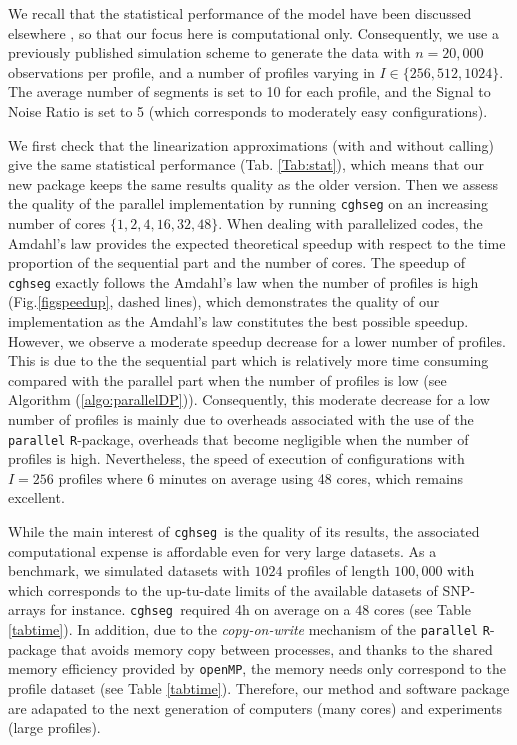 \documentclass[11pt]{llncs}
\newcommand{\esoft}{\texttt{cghseg }}
\begin{document}
{We recall that the statistical performance of the model have been discussed elsewhere \cite{PLH11}, so that our focus here is computational only. Consequently, we use a previously published simulation scheme to generate the data \cite{POA09,PLH11} with $n=20,000$ observations per profile, and a number of profiles varying in $I \in \{256,512,1024\}$. The average number of segments is set to 10 for each profile, and the Signal to Noise Ratio is set to 5 (which corresponds to  moderately easy configurations). 

We first check that the linearization approximations (with and without calling) give the same statistical performance (Tab. \ref{Tab:stat}), which means that our new package keeps the same results quality as the older version. Then we assess the quality of the parallel implementation by running \texttt{cghseg} on an increasing number of cores $\{1,2,4,16,32,48\}$. When dealing with parallelized codes, the Amdahl's law \cite{AG67} provides the expected theoretical speedup with respect to the time proportion of the sequential part and the number of cores. The speedup of \texttt{cghseg} exactly follows the Amdahl's law when the number of profiles is high (Fig.\ref{figspeedup}, dashed lines), which demonstrates the quality of our implementation as the Amdahl's law constitutes the best possible speedup. However, we observe a moderate speedup decrease for a lower number of profiles. This is due to the the sequential part which is relatively more time consuming compared with the parallel part when the number of profiles is low (see Algorithm (\ref{algo:parallelDP})). Consequently, this moderate decrease for a low number of profiles is mainly due to overheads associated with the use of the \texttt{parallel} \texttt{R}-package, overheads that become negligible when the number of profiles is high. Nevertheless, the speed of execution of configurations with $I=256$ profiles where 6 minutes on average using 48 cores, which remains excellent. 

While the main interest of \esoft is the quality of its results, the associated computational expense is affordable even for very large datasets. As a benchmark, we simulated datasets with $1024$ profiles of length $100,000$ with which corresponds to the up-tu-date limits of the available datasets of SNP-arrays for instance. \esoft required 4h on average on a $48$ cores (see Table \ref{tabtime}). In addition, due to the {\it copy-on-write} mechanism  of the \texttt{parallel} \texttt{R}-package  that avoids memory copy between processes, and thanks to the shared memory efficiency provided by \texttt{openMP}, the memory needs only correspond to the profile dataset (see Table \ref{tabtime}). Therefore, our method and software package are adapated to the next generation of computers (many cores) and experiments (large profiles).

}
\end{document}
